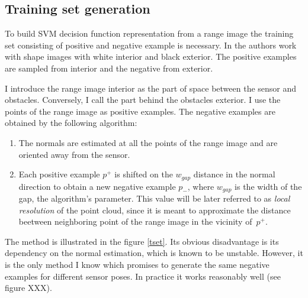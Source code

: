 \subsection{Training set generation}

To build SVM decision function representation from a range image the training set consisting of positive and negative example is necessary. In \cite{SVS2013} the authors work with shape images with white interior and black exterior. The positive examples are sampled from interior and the negative from exterior.

I introduce the range image interior as the part of space between the sensor and obstacles. Conversely, I call the part behind the obstacles exterior. I use the points of the range image as positive examples. The negative examples are obtained by the following algorithm:
\begin{enumerate}
\item
The normals are estimated at all the points of the range image and are oriented away from the sensor.
\item
Each positive example $p^+$ is shifted on the $w_{gap}$ distance in the normal direction to obtain a new negative example $p_{-}$, where $w_{gap}$ is the width of the gap, the algorithm's parameter. This value will be later referred to as \textit{local resolution} of the point cloud, since it is meant to approximate the distance beetween neighboring point of the range image in the vicinity of~$p^+$.
\end{enumerate}
The method is illustrated in the figure \ref{tset}. Its obvious disadvantage is its dependency on the normal estimation, which is known to be unstable. However, it is the only method I know which promises to generate the same negative examples for different sensor poses. In practice it works reasonably well (see figure XXX).
